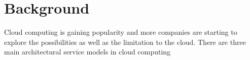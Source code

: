 \chapter{Background}




Cloud computing is gaining popularity and more companies are starting 
to explore the possibilities as well as the limitation to the cloud.
There are three main architectural service models in cloud computing\cite{nist:mell11}


